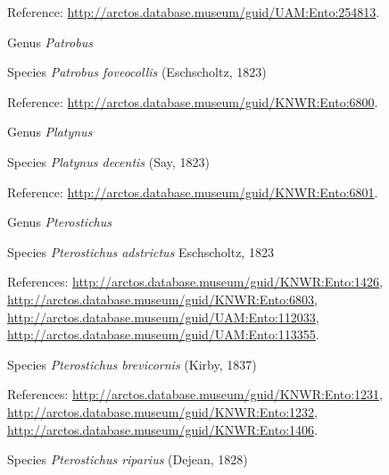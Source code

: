\documentclass[9pt, article]{memoir}
\begin{document}
\begin{multicols}{2}
\vspace{6pt}Reference: 
\url{http://arctos.database.museum/guid/UAM:Ento:254813}.

\vspace{6pt}\noindent\hspace{30pt}Genus \textit{Patrobus}


\vspace{6pt}\noindent\hspace{36pt}Species \textit{Patrobus foveocollis} (Eschscholtz, 1823)


\vspace{6pt}Reference: 
\url{http://arctos.database.museum/guid/KNWR:Ento:6800}.

\vspace{6pt}\noindent\hspace{30pt}Genus \textit{Platynus}


\vspace{6pt}\noindent\hspace{36pt}Species \textit{Platynus decentis} (Say, 1823)


\vspace{6pt}Reference: 
\url{http://arctos.database.museum/guid/KNWR:Ento:6801}.

\vspace{6pt}\noindent\hspace{30pt}Genus \textit{Pterostichus}


\vspace{6pt}\noindent\hspace{36pt}Species \textit{Pterostichus adstrictus} Eschscholtz, 1823


\vspace{6pt}References: 
\url{http://arctos.database.museum/guid/KNWR:Ento:1426}, 
\url{http://arctos.database.museum/guid/KNWR:Ento:6803}, 
\url{http://arctos.database.museum/guid/UAM:Ento:112033}, 
\url{http://arctos.database.museum/guid/UAM:Ento:113355}.

\vspace{6pt}\noindent\hspace{36pt}Species \textit{Pterostichus brevicornis} (Kirby, 1837)


\vspace{6pt}References: 
\url{http://arctos.database.museum/guid/KNWR:Ento:1231}, 
\url{http://arctos.database.museum/guid/KNWR:Ento:1232}, 
\url{http://arctos.database.museum/guid/KNWR:Ento:1406}.

\vspace{6pt}\noindent\hspace{36pt}Species \textit{Pterostichus riparius} (Dejean, 1828)



\end{multicols}
\end{document}
